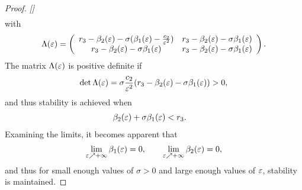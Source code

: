 \begin{proof}{\em []}
\begin{align*}
  \end{align*}
  with
  \begin{align*}
    \Lambda(\varepsilon) = \left(\begin{array}{c c}
        r_{3} - \beta_{2}(\varepsilon) - \sigma (\beta_{1}(\varepsilon) - \frac{c_{2}}{\varepsilon^{2}}) &
        r_{3} - \beta_{2}(\varepsilon) - \sigma \beta_{1}(\varepsilon)\\
        r_{3} - \beta_{2}(\varepsilon) - \sigma \beta_{1}(\varepsilon) & r_{3} - \beta_{2}(\varepsilon) - \sigma \beta_{1}(\varepsilon)
      \end{array}\right).
  \end{align*}
  The matrix $\Lambda(\varepsilon)$ is positive definite if
  \begin{align*}
    \det \Lambda(\varepsilon) = \sigma\frac{c_{2}}{\varepsilon^{2}} (r_{3} - \beta_{2}(\varepsilon) - \sigma
    \beta_{1}(\varepsilon)) > 0,
  \end{align*}
  and thus stability is achieved when
  \begin{align*}
    &\beta_{2}(\varepsilon) + \sigma \beta_{1}(\varepsilon) < r_{3}.
  \end{align*}
  Examining the limits, it becomes apparent that
  \begin{align*}
    \lim_{\varepsilon \nearrow +\infty} \beta_{1}(\varepsilon) = 0, \qquad \lim_{\varepsilon \nearrow +\infty} \beta_{2}(\varepsilon) = 0,
  \end{align*}
  and thus for small enough values of $\sigma > 0$ and large enough values of
  $\varepsilon$, stability is maintained.
\end{proof}
